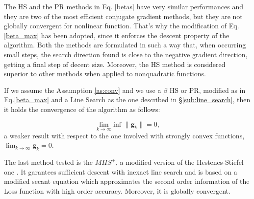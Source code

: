 			The HS and the PR methods in Eq. \ref{betas} have very similar performances and they are two of the most efficient conjugate gradient methods, but they are not globally convergent for nonlinear function\cite{Griffiths-1984}. That's why the modification of Eq. \ref{beta_max} has been adopted\cite{Powell-1986}, since it enforces the descent property of the algorithm.
			Both the methods are formulated in such a way that, when occurring small steps, the search direction found is close to the negative gradient direction, getting a final step of decent size\cite{Gilbert-1992}.
			Moreover, the HS method is considered superior to other methods when applied to nonquadratic functions.

			If we assume the Assumption \ref{as:conv} and we use a $\beta$ HS or PR, modified as in Eq.\ref{beta_max} and a Line Search as the one described in \S\ref{sub:line_search}, then it holds the convergence of the algorithm as follows\cite{Gilbert-1992}:

			\begin{equation}
			\label{conv_cg}
			  \lim_{k \to \infty}\text{inf } \|\textbf{g}_k\| = 0,
			\end{equation}
			a weaker result with respect to the one involved with strongly convex functions, $\lim_{k \to \infty} \textbf{g}_k = 0.$



			The last method tested is the $MHS^+$, a modified version of the Hestenes-Stiefel one \cite{LIVIERIS2013491}.
			It garantees sufficient descent with inexact line search and is based on a modified secant equation which approximates the second order information of the Loss function with high order accuracy. Moreover, it is globally convergent.

